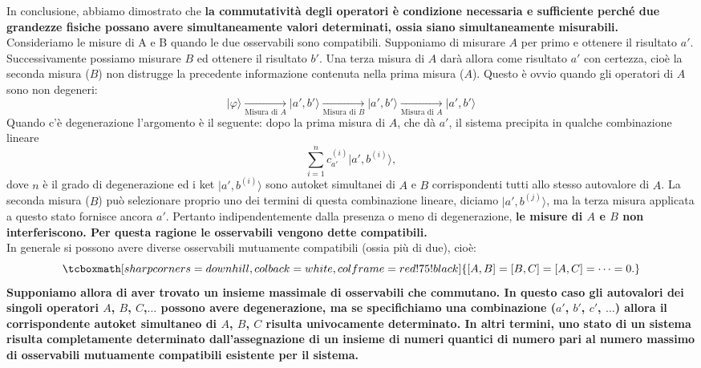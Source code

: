 In conclusione, abbiamo dimostrato che \textbf{la commutatività degli operatori è condizione necessaria e sufficiente perché due grandezze fisiche possano avere simultaneamente valori determinati, ossia siano simultaneamente misurabili.}\\

Consideriamo le misure di A e B quando le due osservabili sono compatibili. Supponiamo di misurare $A$ per primo e ottenere il risultato $a'$. Successivamente possiamo misurare $B$ ed ottenere il risultato $b'$. Una terza misura di $A$ darà allora come risultato $a'$ con certezza, cioè la seconda misura ($B$) non distrugge la precedente informazione contenuta nella prima misura ($A$). Questo è ovvio quando gli operatori di $A$ sono non degeneri:
	\begin{equation}
		\vert \varphi \rangle \xrightarrow[\textrm{Misura di }A]{ } \vert a',b' \rangle \xrightarrow[\textrm{Misura di }B]{ } \vert a',b' \rangle \xrightarrow[\textrm{Misura di }A]{ } \vert a',b' \rangle  
	\end{equation}
Quando c'è degenerazione l'argomento  è il seguente: dopo la prima misura di $A$, che dà $a'$, il sistema precipita in qualche combinazione lineare
	\begin{equation}
		\sum _{i=1} ^n c_{a'} ^{(i)} \vert a', b^{(i)} \rangle ,
	\end{equation}
dove $n$ è il grado di degenerazione ed i ket $\vert a', b^{(i)} \rangle $ sono autoket simultanei di $A$ e $B$ corrispondenti tutti allo stesso autovalore di $A$. La seconda misura ($B$) può selezionare proprio uno dei termini di questa combinazione lineare, diciamo $\vert a', b^{(j)} \rangle $, ma la terza misura applicata a questo stato fornisce ancora $a'$. Pertanto indipendentemente dalla presenza o meno di degenerazione, \textbf{le misure di $A$ e $B$ non interferiscono. Per questa ragione le osservabili vengono dette compatibili.}\\

In generale si possono avere diverse osservabili mutuamente compatibili (ossia più di due), cioè:
	\begin{equation}
		\tcboxmath[sharp corners=downhill ,colback=white,colframe=red!75!black]{
			\left[A,B\right]=\left[B,C\right]=\left[A,C\right]=\dots =0.
			}
	\end{equation}
\textbf{Supponiamo allora di aver trovato un insieme massimale di osservabili che commutano. In questo caso gli autovalori dei singoli operatori $A$, $B$, $C$,$\dots$ possono avere degenerazione, ma se specifichiamo una combinazione ($a'$, $b'$, $c'$, $\dots$) allora il corrispondente autoket simultaneo di $A$, $B$, $C$ risulta univocamente determinato. In altri termini, uno stato di un sistema risulta completamente determinato dall'assegnazione di un insieme di numeri quantici di numero pari al numero massimo di osservabili mutuamente compatibili esistente per il sistema.}
